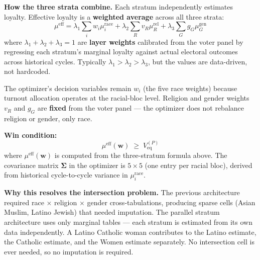 \documentclass[11pt]{article}
\newcommand{\veq}{V_{\mathrm{eq}}}
\newcommand{\boldSigma}{\boldsymbol{\Sigma}}
\begin{document}
\noindent\textbf{How the three strata combine.}
Each stratum independently estimates loyalty. Effective loyalty is a
\textbf{weighted average} across all three strata:
\[
  \mu^{\text{eff}} = \lambda_1 \sum_i w_i \mu_i^{\text{race}}
  + \lambda_2 \sum_R v_R \mu_R^{\text{rel}}
  + \lambda_3 \sum_G g_G \mu_G^{\text{gen}}
\]
where $\lambda_1 + \lambda_2 + \lambda_3 = 1$ are \textbf{layer weights} calibrated
from the voter panel by regressing each stratum's marginal loyalty against actual
electoral outcomes across historical cycles. Typically $\lambda_1 > \lambda_2 >
\lambda_3$, but the values are data-driven, not hardcoded.

The optimizer's decision variables remain $w_i$ (the five race weights) because
turnout allocation operates at the racial-bloc level. Religion and gender weights
$v_R$ and $g_G$ are \textbf{fixed} from the voter panel --- the optimizer does not
rebalance religion or gender, only race.

\medskip
\noindent\textbf{Win condition:}
\[
  \mu^{\text{eff}}(\mathbf{w}) \;\geq\; \veq^{(P)}
\]
where $\mu^{\text{eff}}(\mathbf{w})$ is computed from the three-stratum formula above.
The covariance matrix $\boldSigma$ in the optimizer is $5 \times 5$ (one entry per
racial bloc), derived from historical cycle-to-cycle variance in $\mu_i^{\text{race}}$.

\medskip
\noindent\textbf{Why this resolves the intersection problem.}
The previous architecture required race $\times$ religion $\times$ gender
cross-tabulations, producing sparse cells (Asian Muslim, Latino Jewish) that needed
imputation. The parallel stratum architecture uses only marginal tables --- each
stratum is estimated from its own data independently. A Latino Catholic woman
contributes to the Latino estimate, the Catholic estimate, and the Women estimate
separately. No intersection cell is ever needed, so no imputation is required.
\end{document}
